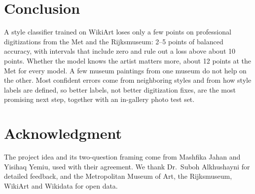 \documentclass[conference]{IEEEtran}
\begin{document}
\section{Conclusion}

A style classifier trained on WikiArt loses only a few points on professional digitizations from the Met and the Rijksmuseum: 2--5 points of balanced accuracy, with intervals that include zero and rule out a loss above about 10 points. Whether the model knows the artist matters more, about 12 points at the Met for every model. A few museum paintings from one museum do not help on the other. Most confident errors come from neighboring styles and from how style labels are defined, so better labels, not better digitization fixes, are the most promising next step, together with an in-gallery photo test set.

\section*{Acknowledgment}
The project idea and its two-question framing come from Mashfika Jahan and Yisihaq Yemiu, used with their agreement. We thank Dr.~Suboh Alkhushayni for detailed feedback, and the Metropolitan Museum of Art, the Rijksmuseum, WikiArt and Wikidata for open data.



\end{document}
